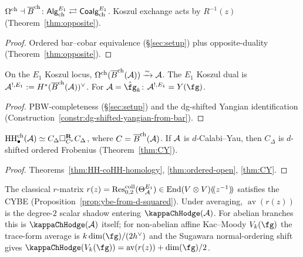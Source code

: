 \begin{theorem}
\label{thm:e1-theorem-A}
$\Omega^{\mathrm{ch}} \dashv \overline{B}^{\mathrm{ch}}\colon
\mathsf{Alg}^{E_1}_{\mathrm{ch}} \rightleftarrows
\mathsf{Coalg}^{E_1}_{\mathrm{ch}}$.
Koszul exchange acts by $R^{-1}(z)$
\textup{(}Theorem~\textup{\ref{thm:opposite}}).
\end{theorem}

\begin{proof}
Ordered bar--cobar equivalence (\S\ref{sec:setup}) plus
opposite-duality (Theorem~\ref{thm:opposite}).
\end{proof}

\begin{theorem}
\label{thm:e1-theorem-B}
On the $E_1$ Koszul locus,
$\Omega^{\mathrm{ch}}(\overline{B}^{\mathrm{ch}}(\mathcal{A})) \xrightarrow{\sim} \mathcal{A}$.
The $E_1$ Koszul dual is
$\mathcal{A}^{!,E_1} := H^*(\overline{B}^{\mathrm{ch}}(\mathcal{A}))^\vee$.
For $\cA = \hat\fg_k$:
$\cA^{!,E_1} = Y(\fg)$.
\end{theorem}

\begin{proof}
PBW-completeness (\S\ref{sec:setup}) and the dg-shifted Yangian
identification
(Construction~\ref{constr:dg-shifted-yangian-from-bar}).
\end{proof}

\begin{theorem}
\label{thm:e1-theorem-C}
$\operatorname{HH}^{\mathrm{ch}}_\bullet(\mathcal{A})
\simeq
C_\Delta \square_{C^e}^{\mathbf{R}} C_\Delta$,
where $C = \overline{B}^{\mathrm{ch}}(\mathcal{A})$.
If $\mathcal{A}$ is $d$-Calabi--Yau, then $C_\Delta$ is
$d$-shifted ordered Frobenius
\textup{(}Theorem~\textup{\ref{thm:CY}}).
\end{theorem}

\begin{proof}
Theorems~\ref{thm:HH-coHH-homology}, \ref{thm:ordered-open},
\ref{thm:CY}.
\end{proof}

\begin{theorem}
\label{thm:e1-theorem-D}
The classical $r$-matrix
$r(z) = \operatorname{Res}^{\mathrm{coll}}_{0,2}(\Theta_{\mathcal{A}}^{E_1})
\in \operatorname{End}(V \otimes V)(\!(z^{-1})\!)$
satisfies the CYBE
\textup{(}Proposition~\textup{\ref{prop:ybe-from-d-squared}}).
Under averaging, $\operatorname{av}(r(z))$ is the degree-$2$
scalar shadow entering $\kappaChHodge(\cA)$. For abelian branches this
is $\kappaChHodge(\cA)$ itself; for non-abelian affine
Kac--Moody $V_k(\fg)$ the trace-form average is
$k\dim(\fg)/(2h^\vee)$ and the Sugawara normal-ordering shift gives
$\kappaChHodge(V_k(\fg))=\operatorname{av}(r(z))+\dim(\fg)/2$.
\end{theorem}

